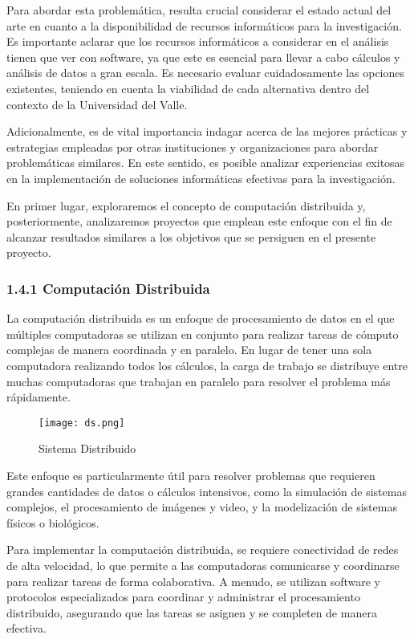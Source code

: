 \begin{spacing}{1.5}
  Para abordar esta problemática, resulta crucial considerar el estado actual
  del arte en cuanto a la disponibilidad de recursos informáticos para la
  investigación. Es importante aclarar que los recursos informáticos a considerar
  en el análisis tienen que ver con software, ya que este es esencial para llevar
  a cabo cálculos y análisis de datos a gran escala. Es necesario evaluar
  cuidadosamente las opciones existentes, teniendo en cuenta la viabilidad de
  cada alternativa dentro del contexto de la Universidad del Valle.

  Adicionalmente, es de vital importancia indagar acerca de las mejores
  prácticas y estrategias empleadas por otras instituciones y organizaciones para
  abordar problemáticas similares. En este sentido, es posible analizar
  experiencias exitosas en la implementación de soluciones informáticas efectivas
  para la investigación.

  En primer lugar, exploraremos el concepto de computación distribuida y,
  posteriormente, analizaremos proyectos que emplean este enfoque con el fin de
  alcanzar resultados similares a los objetivos que se persiguen en el presente
  proyecto.

  \subsubsection{1.4.1 Computación Distribuida}

  La computación distribuida es un enfoque de procesamiento de datos en el que
  múltiples computadoras se utilizan en conjunto para realizar tareas de cómputo
  complejas de manera coordinada y en paralelo. En lugar de tener una sola
  computadora realizando todos los cálculos, la carga de trabajo se distribuye
  entre muchas computadoras que trabajan en paralelo para resolver el problema
  más rápidamente.

  \begin{figure}[h]
    \centering
    \texttt{[image: ds.png]}
    \caption{Sistema Distribuido}
    \label{fig:etiqueta}
  \end{figure}

  Este enfoque es particularmente útil para resolver problemas que requieren
  grandes cantidades de datos o cálculos intensivos, como la simulación de
  sistemas complejos, el procesamiento de imágenes y video, y la modelización de
  sistemas físicos o biológicos.

  Para implementar la computación distribuida, se requiere conectividad de
  redes de alta velocidad, lo que permite a las computadoras comunicarse y
  coordinarse para realizar tareas de forma colaborativa. A menudo, se utilizan
  software y protocolos especializados para coordinar y administrar el
  procesamiento distribuido, asegurando que las tareas se asignen y se completen
  de manera efectiva.


\end{spacing}
